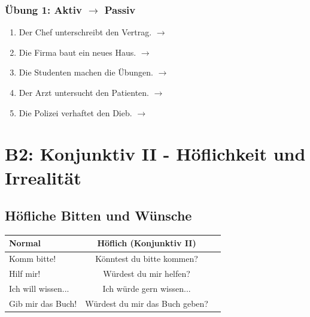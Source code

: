 \subsection*{Übung 1: Aktiv $\rightarrow$ Passiv}
\begin{enumerate}
    \item Der Chef unterschreibt den Vertrag. $\rightarrow$ \underline{\hspace{2cm}}
    \item Die Firma baut ein neues Haus. $\rightarrow$ \underline{\hspace{2cm}}
    \item Die Studenten machen die Übungen. $\rightarrow$ \underline{\hspace{2cm}}
    \item Der Arzt untersucht den Patienten. $\rightarrow$ \underline{\hspace{2cm}}
    \item Die Polizei verhaftet den Dieb. $\rightarrow$ \underline{\hspace{2cm}}
\end{enumerate}


\chapterend

\chapter{B2: Konjunktiv II - Höflichkeit und Irrealität}
\label{cha:B2KonjunktivII}

\section{Höfliche Bitten und Wünsche}
\label{sec:B2Hoeflich}

\begin{center}
\begin{tabular}{|l|c|c|}
\hline
Normal & Höflich (Konjunktiv II) & \\ \hline
Komm bitte! & Könntest du bitte kommen? & \\ \hline
Hilf mir! & Würdest du mir helfen? & \\ \hline
Ich will wissen... & Ich würde gern wissen... & \\ \hline
Gib mir das Buch! & Würdest du mir das Buch geben? & \\ \hline
\end{tabular}
\end{center}

